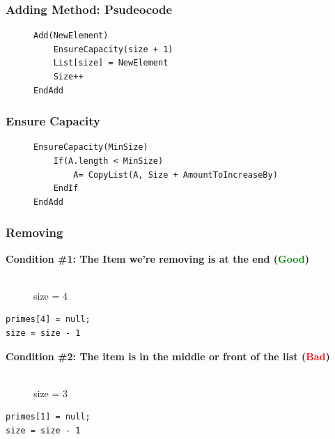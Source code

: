 \documentclass{beamer}
\begin{document}
\begin{frame}[fragile]
    \frametitle{Adding Method: Psudeocode}
    \begin{figure}
    \centering
    \begin{lstlisting}[basicstyle=\small]
Add(NewElement)
    EnsureCapacity(size + 1)
    List[size] = NewElement
    Size++
EndAdd
    \end{lstlisting}
    \end{figure}
\end{frame}


\begin{frame}[fragile]
    \frametitle{Ensure Capacity}
    \begin{figure}
    \centering
    \begin{lstlisting}[basicstyle=\small]
EnsureCapacity(MinSize)
    If(A.length < MinSize)
        A= CopyList(A, Size + AmountToIncreaseBy)
    EndIf
EndAdd
    \end{lstlisting}
\end{figure}
\end{frame}

\begin{frame}[fragile]
    \frametitle{Removing}
    \textbf{Condition \#1: The Item we're removing is at the end (\textcolor{green}{Good})}
    \begin{figure}[H]
        \centering
        \\
        size = 4
    \end{figure}
    \vfill
    \begin{lstlisting}[frame=trBL, basicstyle=\small]
primes[4] = null;
size = size - 1
    \end{lstlisting}
    \textbf{Condition \#2: The item is in the middle or front of the list (\textcolor{red}{Bad})} 
    \begin{figure}[H]
        \centering
        \\
        size = 3 
    \end{figure}
    \vfill
    \begin{lstlisting}[frame=trBL, basicstyle=\small]
primes[1] = null;
size = size - 1
    \end{lstlisting}
\end{frame}
\end{document}
